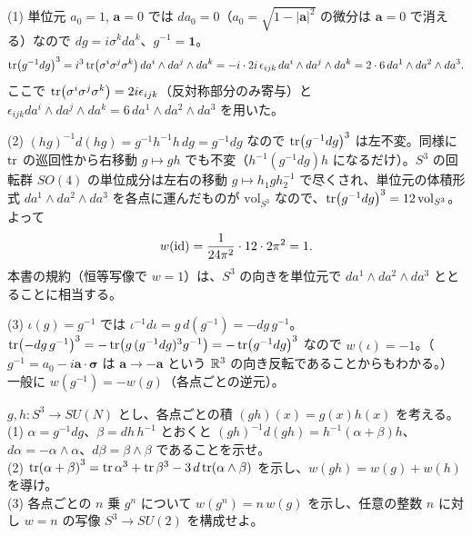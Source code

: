 \begin{solution}
(1) 単位元 $a_0=1$, $\bm a=0$ では $da_0=0$（$a_0=\sqrt{1-\lvert\bm a\rvert^2}$ の微分は $\bm a=0$ で消える）なので $dg=i\sigma^kda^k$、$g^{-1}=\mathbf 1$。
\[
\tr(g^{-1}dg)^3=i^3\tr(\sigma^i\sigma^j\sigma^k)\,da^i\wedge da^j\wedge da^k=-i\cdot2i\,\epsilon_{ijk}\,da^i\wedge da^j\wedge da^k=2\cdot6\,da^1\wedge da^2\wedge da^3 .
\]
ここで $\tr(\sigma^i\sigma^j\sigma^k)=2i\epsilon_{ijk}$（反対称部分のみ寄与）と $\epsilon_{ijk}da^i\wedge da^j\wedge da^k=6\,da^1\wedge da^2\wedge da^3$ を用いた。

(2) $(hg)^{-1}d(hg)=g^{-1}h^{-1}h\,dg=g^{-1}dg$ なので $\tr(g^{-1}dg)^3$ は左不変。同様に $\tr$ の巡回性から右移動 $g\mapsto gh$ でも不変（$h^{-1}(g^{-1}dg)h$ になるだけ）。$S^3$ の回転群 $SO(4)$ の単位成分は左右の移動 $g\mapsto h_1gh_2^{-1}$ で尽くされ、単位元の体積形式 $da^1\wedge da^2\wedge da^3$ を各点に運んだものが $\mathrm{vol}_{S^3}$ なので、$\tr(g^{-1}dg)^3=12\,\mathrm{vol}_{S^3}$。よって
\[
w(\mathrm{id})=\frac{1}{24\pi^2}\cdot12\cdot2\pi^2=1 .
\]
本書の規約（恒等写像で $w=1$）は、$S^3$ の向きを単位元で $da^1\wedge da^2\wedge da^3$ ととることに相当する。

(3) $\iota(g)=g^{-1}$ では $\iota^{-1}d\iota=g\,d(g^{-1})=-dg\,g^{-1}$。$\tr(-dg\,g^{-1})^3=-\tr(g\,(g^{-1}dg)^3g^{-1})=-\tr(g^{-1}dg)^3$ なので $w(\iota)=-1$。（$g^{-1}=a_0-i\bm a\cdot\bm\sigma$ は $\bm a\to-\bm a$ という $\mathbb{R}^3$ の向き反転であることからもわかる。）一般に $w(g^{-1})=-w(g)$（各点ごとの逆元）。
\end{solution}

\begin{problem}[難易度 B]\label{ch03-prob-wadd}
$g,h\colon S^3\to SU(N)$ とし、各点ごとの積 $(gh)(x)=g(x)h(x)$ を考える。\\
(1) $\alpha=g^{-1}dg$、$\beta=dh\,h^{-1}$ とおくと $(gh)^{-1}d(gh)=h^{-1}(\alpha+\beta)h$、$d\alpha=-\alpha\wedge\alpha$、$d\beta=\beta\wedge\beta$ であることを示せ。\\
(2) $\tr(\alpha+\beta)^3=\tr\alpha^3+\tr\beta^3-3\,d\tr(\alpha\wedge\beta)$ を示し、$w(gh)=w(g)+w(h)$ を導け。\\
(3) 各点ごとの $n$ 乗 $g^n$ について $w(g^n)=n\,w(g)$ を示し、任意の整数 $n$ に対し $w=n$ の写像 $S^3\to SU(2)$ を構成せよ。
\end{problem}

